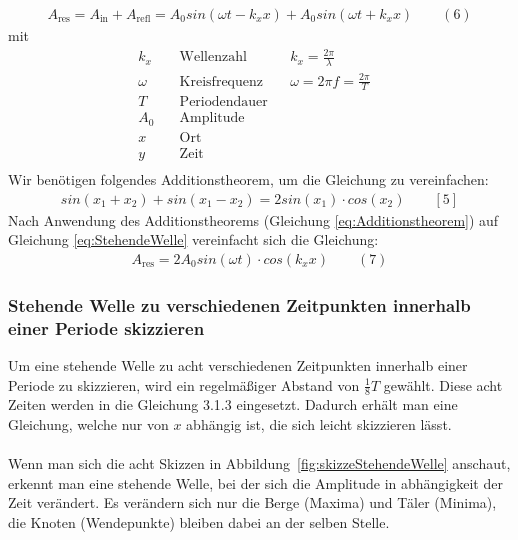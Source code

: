 \documentclass[a4paper]{scrartcl}
\numberwithin{equation}{subsection}
\begin{document}
\begin{align}
\label{eq:StehendeWelle}
A_{\text{res}} = A_{\text{in}} + A_{\text{refl}} = A_0sin(\omega t-k_xx)+A_0sin(\omega t+k_xx)\qquad (6)
\end{align}
mit
\begin{align*}
k_x\quad &\text{Wellenzahl}&&k_x=\frac{2\pi}{\lambda}&\\
\omega \quad&\text{Kreisfrequenz}&&\omega=2\pi f=\frac{2\pi}{T}&\\
T\quad&\text{Periodendauer}&\\
A_{0}\quad&\text{Amplitude}&\\
x\quad&\text{Ort}&\\
y\quad&\text{Zeit}&\\
\end{align*}
Wir benötigen folgendes Additionstheorem, um die Gleichung zu vereinfachen:
\begin{align}
\label{eq:Additionstheorem}
sin(x_1+x_2)+sin(x_1-x_2)=2sin(x_1)\cdot cos(x_2)\qquad [5]
\end{align}
Nach Anwendung des Additionstheorems (Gleichung \ref{eq:Additionstheorem}) auf Gleichung \ref{eq:StehendeWelle} vereinfacht sich die Gleichung:
\begin{align}
A_{\text{res}}=2A_0sin(\omega t)\cdot cos(k_xx) \qquad (7)
\end{align}

\subsubsection{Stehende Welle zu verschiedenen Zeitpunkten innerhalb einer Periode skizzieren}
Um eine stehende Welle zu acht verschiedenen Zeitpunkten innerhalb einer Periode zu skizzieren, wird ein regelmäßiger Abstand von $\frac{1}{8}T$ gewählt. Diese acht Zeiten werden in die Gleichung 3.1.3 eingesetzt. Dadurch erhält man eine Gleichung, welche nur von $x$ abhängig ist, die sich leicht skizzieren lässt.\\\\
Wenn man sich die acht Skizzen in Abbildung~\ref{fig:skizzeStehendeWelle} anschaut, erkennt man eine stehende Welle, bei der sich die Amplitude in abhängigkeit der Zeit verändert. Es verändern sich nur die Berge (Maxima) und Täler (Minima), die Knoten (Wendepunkte) bleiben dabei an der selben Stelle.
\end{document}
